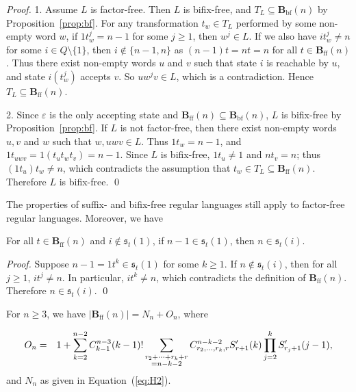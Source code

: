\documentclass{llncs}
\renewcommand{\ge}{\geqslant}
\newcommand{\eps}{\varepsilon}
\newcommand{\seq}{{\mathfrak{s}}}
\newcommand{\Bbf}{\mathbf{B}_{\mathrm{bf}}}
\newcommand{\Bff}{\mathbf{B}_{\mathrm{ff}}}
\begin{document}
\begin{proof}
1. Assume $L$ is factor-free. Then $L$ is bifix-free, and $T_L \subseteq \Bbf(n)$ by Proposition~\ref{prop:bf}. For any transformation $t_w \in T_L$ performed by some non-empty word $w$, if $1t^j_w = n - 1$ for some $j \ge 1$, then $w^j \in L$. If we also have $it^j_w \neq n$ for some $i \in Q \setminus \{1\}$, then $i \not\in \{n - 1, n\}$ as $(n-1)t = nt = n$ for all $t \in \Bff(n)$. Thus there exist non-empty words $u$ and $v$ such that state $i$ is reachable by $u$, and state $i(t^j_w)$ accepts $v$. So $uw^jv \in L$, which is a contradiction. Hence $T_L \subseteq \Bff(n)$. 

2. Since $\eps$ is the only accepting state and $\Bff(n) \subseteq \Bbf(n)$, $L$ is bifix-free by Proposition~\ref{prop:bf}. If $L$ is not factor-free, then there exist non-empty words $u, v$ and $w$ such that $w, uwv \in L$. Thus $1t_w = n - 1$, and $1t_{uwv} = 1(t_ut_wt_v) = n - 1$. Since $L$ is bifix-free, $1t_u \neq 1$ and $nt_v = n$; thus $(1t_u)t_w \neq n$, which contradicts the assumption that $t_w \in T_L \subseteq \Bff(n)$. Therefore $L$ is bifix-free. \qed
\end{proof}

The properties of suffix- and bifix-free regular languages still apply to factor-free regular languages. Moreover, we have 


\begin{lemma}\label{lem:ffseq} 
For all $t \in \Bff(n)$ and $i \not\in \seq_t(1)$, if $n-1 \in \seq_t(1)$, then $n \in \seq_t(i)$. 
\end{lemma}

\begin{proof} 
Suppose $n-1 = 1t^k \in \seq_t(1)$ for some $k \ge 1$. If $n \not\in \seq_t(i)$, then for all $j \ge 1$, $it^j \neq n$. In particular, $it^k \neq n$, which contradicts the definition of $\Bff(n)$. Therefore $n \in \seq_t(i)$. \qed
\end{proof}



\begin{lemma}\label{lem:Fn} 
For $n \ge 3$, we have $|\Bff(n)| = N_n + O_n$, where 

\begin{eqnarray*} 
  O_n &=& 1 + \sum_{k=2}^{n-2} C^{n-3}_{k-1} (k-1)! \sum_{\begin{subarray}{c} 
      r_2 + \cdots + r_k + r \\ 
          = n-k-2
    \end{subarray}}
    C^{n-k-2}_{r_2,\ldots,r_k,r} S'_{r+1}(k) \prod_{j=2}^k S'_{r_j+1}(j-1), 
\end{eqnarray*}
and $N_n$ as given in Equation~(\ref{eq:H2}). 
\end{lemma}
\end{document}
